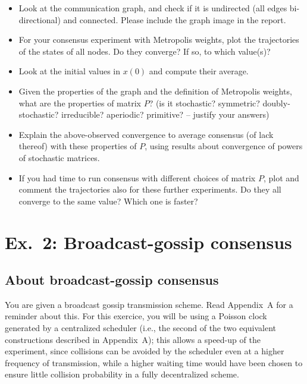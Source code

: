 \documentclass[oneside]{article}
\begin{document}
\begin{itemize}
\item Look at the communication graph, and check if it is undirected (all edges bi-directional) and connected. Please include the graph image in the report.
\item For your consensus experiment with Metropolis weights, plot the trajectories of the states of all nodes. Do they converge? If so, to which value(s)?
\item Look at the initial values in $x(0)$ and compute their average.
\item Given the properties of the graph and the definition of Metropolis weights, what are the properties of matrix $P$? (is it stochastic? symmetric? doubly-stochastic? irreducible? aperiodic? primitive? -- justify your answers)
\item 
Explain the above-observed convergence to average consensus (of lack thereof) with these properties of $P$, using results about convergence of powers of stochastic matrices.
\item If you had time to run consensus with different choices of matrix $P$, plot and comment the trajectories also for these further experiments. Do they all converge to the same value? Which one is faster?
\end{itemize}



\section{Ex.~2: Broadcast-gossip consensus}

\subsection{About broadcast-gossip consensus} \label{sec:about-gossip}


You are given a broadcast gossip transmission scheme. Read Appendix~A for a reminder about this.
For this exercice, you will be using a Poisson clock generated by a centralized scheduler (i.e., the second of the two equivalent constructions described in Appendix~A); this allows a speed-up of the experiment, since collisions can be avoided by the scheduler even at a higher frequency of transmission, while a higher waiting time would have been chosen to ensure little collision probability in a fully decentralized scheme.\\
\end{document}
